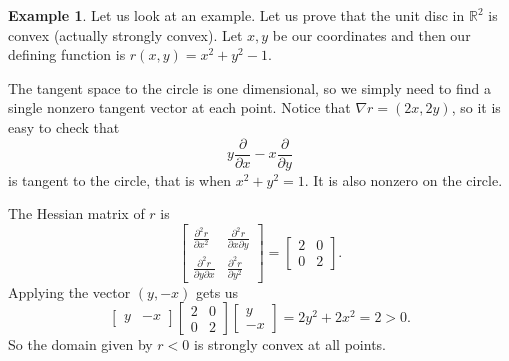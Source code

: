 \documentclass[12pt,openany]{book}
\newcommand{\R}{{\mathbb{R}}}
\theoremstyle{plain}
\theoremstyle{remark}
\theoremstyle{definition}
\theoremstyle{exercise}
\theoremstyle{example}
\newtheorem{example}[thm]{Example}
\begin{document}
\begin{example}
Let us look at an example.  Let us prove that the unit disc in $\R^2$ is
convex (actually strongly convex).  Let $x,y$ be our coordinates and then
our defining function is $r(x,y) = x^2+y^2-1$.

The tangent space to the circle is one dimensional, so we simply need to
find a single nonzero tangent vector at each point.
Notice that $\nabla r = (2x,2y)$, so it is easy to check that
\begin{equation*}
y \frac{\partial}{\partial x} - x \frac{\partial}{\partial y}
\end{equation*}
is tangent to the circle, that is when $x^2+y^2=1$.  It is also nonzero on the circle.

The Hessian matrix of $r$ is
\begin{equation*}
\begin{bmatrix}
\frac{\partial^2 r}{\partial x^2} &
\frac{\partial^2 r}{\partial x \partial y} \\
\frac{\partial^2 r}{\partial y \partial x} &
\frac{\partial^2 r}{\partial y^2}
\end{bmatrix}
=
\begin{bmatrix}
2 & 0 \\
0 & 2
\end{bmatrix} .
\end{equation*}
Applying the vector $(y,-x)$ gets us
\begin{equation*}
\begin{bmatrix}
y & -x
\end{bmatrix}
\begin{bmatrix}
2 & 0 \\
0 & 2
\end{bmatrix}
\begin{bmatrix}
y \\ -x
\end{bmatrix}
=
2y^2+2x^2 = 2 > 0 .
\end{equation*}
So the domain given by $r < 0$ is strongly convex at all points.
\end{example}
\end{document}

